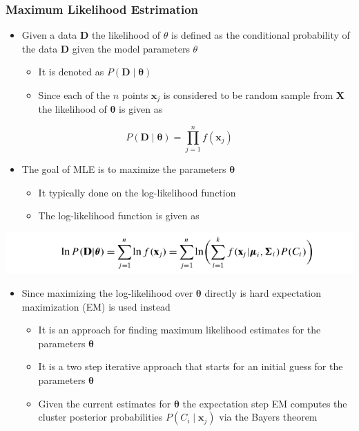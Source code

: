 \documentclass[11pt]{article}
\begin{document}
\subsubsection{Maximum Likelihood Estrimation}
\label{sec:org8843749}
\begin{itemize}
\item Given a data \(\mathbf D\) the likelihood of \(\theta\) is defined as the conditional probability of the data \(\mathbf D\) given the model parameters \(\theta\)
\begin{itemize}
\item It is denoted as \(P(\mathbf D \mid \mathbf \theta)\)
\item Since each of the \(n\) points \(\pmb x_j\) is considered to be random sample from \(\mathbf X\) the likelihood of \(\mathbf \theta\) is given as
\end{itemize}
\end{itemize}
\begin{equation}
  P(\mathbf D \mid \mathbf \theta) = \prod_{j=1}^n f(\pmb x_j)
\end{equation}
\begin{itemize}
\item The goal of MLE is to maximize the parameters \(\mathbf \theta\)
\begin{itemize}
\item It typically done on the log-likelihood function
\item The log-likelihood function is given as
\end{itemize}
\end{itemize}
\begin{center}
\includegraphics[width=.9\linewidth]{Representative-based Clustering/screenshot_2018-11-27_19-55-44.png}
\end{center}
\begin{itemize}
\item Since maximizing the log-likelihood over \(\mathbf \theta\) directly is hard expectation maximization (EM) is used instead
\begin{itemize}
\item It is an approach for finding maximum likelihood estimates for the parameters \(\mathbf \theta\)
\item It is a two step iterative approach that starts for an initial guess for the parameters \(\pmb \theta\)
\item Given the current estimates for \(\mathbf \theta\) the expectation step EM computes the cluster posterior probabilities \(P(C_i \mid \pmb x_j)\) via the Bayers theorem
\end{itemize}
\end{itemize}
\end{document}
